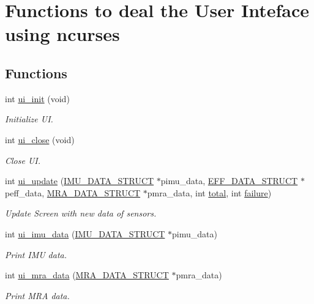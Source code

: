 \hypertarget{group__ui}{\section{Functions to deal the User Inteface using ncurses}
\label{group__ui}
}
\subsection*{Functions}
\begin{DoxyCompactItemize}
\item 
int \hyperlink{group__ui_gab7bfb453918dcc296ff0cea3c79453d0}{ui\-\_\-init} (void)
\begin{DoxyCompactList}\small\item\em Initialize U\-I. \end{DoxyCompactList}\item 
int \hyperlink{group__ui_ga65d8b92b634da17c344458cd57e61f3e}{ui\-\_\-close} (void)
\begin{DoxyCompactList}\small\item\em Close U\-I. \end{DoxyCompactList}\item 
int \hyperlink{group__ui_ga1559840369fc944a83a3666ef7959413}{ui\-\_\-update} (\hyperlink{structIMU__DATA__STRUCT}{I\-M\-U\-\_\-\-D\-A\-T\-A\-\_\-\-S\-T\-R\-U\-C\-T} $\ast$pimu\-\_\-data, \hyperlink{structEFF__DATA__STRUCT}{E\-F\-F\-\_\-\-D\-A\-T\-A\-\_\-\-S\-T\-R\-U\-C\-T} $\ast$peff\-\_\-data, \hyperlink{structMRA__DATA__STRUCT}{M\-R\-A\-\_\-\-D\-A\-T\-A\-\_\-\-S\-T\-R\-U\-C\-T} $\ast$pmra\-\_\-data, int \hyperlink{threads__linux_8c_ac7af894858cf396a219d632f40afdc8d}{total}, int \hyperlink{threads__linux_8c_a4f35e5ea2395561d0bd3b2f45612dc2c}{failure})
\begin{DoxyCompactList}\small\item\em Update Screen with new data of sensors. \end{DoxyCompactList}\item 
int \hyperlink{group__ui_ga7d5a9d9a75693709de408781d001a6a6}{ui\-\_\-imu\-\_\-data} (\hyperlink{structIMU__DATA__STRUCT}{I\-M\-U\-\_\-\-D\-A\-T\-A\-\_\-\-S\-T\-R\-U\-C\-T} $\ast$pimu\-\_\-data)
\begin{DoxyCompactList}\small\item\em Print I\-M\-U data. \end{DoxyCompactList}\item 
int \hyperlink{group__ui_gaefec243c5df45db0350c1abbccf20e3b}{ui\-\_\-mra\-\_\-data} (\hyperlink{structMRA__DATA__STRUCT}{M\-R\-A\-\_\-\-D\-A\-T\-A\-\_\-\-S\-T\-R\-U\-C\-T} $\ast$pmra\-\_\-data)
\begin{DoxyCompactList}\small\item\em Print M\-R\-A data. \end{DoxyCompactList}\end{DoxyCompactItemize}


